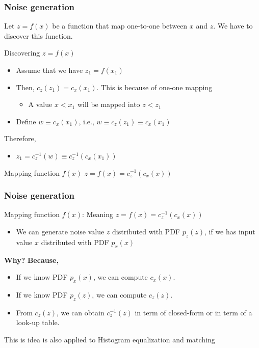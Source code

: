 \documentclass[english,11pt,table,handout]{beamer}
\begin{document}
\frame
{
	\frametitle{Noise generation}
	
	Let $z = f(x)$ be a function that map one-to-one between $x$ and $z$. We have to discover this function.
	\begin{block}{Discovering $z = f(x)$ }
		\begin{itemize}
			\item Assume that we have $z_1 = f(x_1)$ 
			\item Then, $c_z(z_1) = c_x(x_1)$. This is because of one-one mapping
			\begin{itemize}
				\item A value $x < x_1$ will be mapped into $z < z_1$
			\end{itemize}
			\item Define $w \equiv c_x(x_1)$, i.e., $w \equiv c_z(z_1) \equiv c_x(x_1)$
		\end{itemize}
		
		Therefore,
		\begin{itemize}
			\item $z_1 = c_z^{-1}(w) \equiv   c_z^{-1}(c_x(x_1))$
		\end{itemize}
	\end{block}
	\begin{alertblock}{Mapping function $f(x)$}
		\centering
		$z = f(x) =  c_z^{-1}(c_x(x))$
		
	\end{alertblock}
	

}
\frame
{
	\frametitle{Noise generation}
	
	\begin{alertblock}{Mapping function $f(x)$: Meaning}
		\centering
		$z = f(x) =  c_z^{-1}(c_x(x))$
		\begin{itemize}
			\item We can generate noise value $z$ distributed with PDF $p_z(z)$, if we has input value $x$ distributed with PDF $p_x(x)$
		\end{itemize}
		\flushleft
		\alert{\textbf{Why?}}
		\newline
		\alert{\textbf{Because,}}
		\begin{itemize}
			\item If we know PDF $p_x(x)$, we can compute $c_x(x)$.
			\item If we know PDF $p_z(z)$, we can compute $c_z(z)$.
			\item From $c_z(z)$, we can obtain $c_z^{-1}(z)$ in term of closed-form or in term of a look-up table.
		\end{itemize}
	\end{alertblock}
	
	\begin{alertblock}{}
		This is idea is also applied to Histogram equalization and matching
	\end{alertblock}	
}
\end{document}
